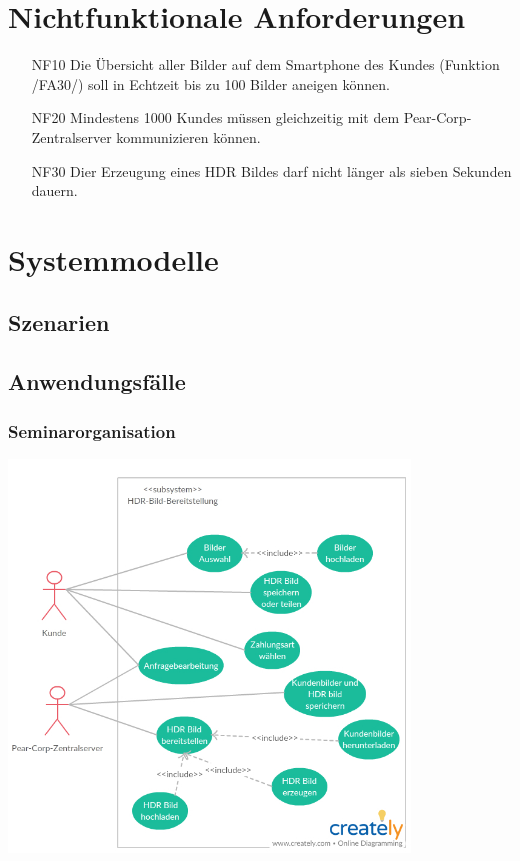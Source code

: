 \documentclass[parskip=full]{scrartcl}
\begin{document}
\section{Nichtfunktionale Anforderungen}
\begin{itemize}[nosep]
\item[NF10] Die Übersicht aller Bilder auf dem \gls{Smartphone} des \glspl{Kunde} (Funktion /FA30/) soll in Echtzeit bis zu 100 Bilder aneigen können.
\item[NF20] Mindestens 1000 \glspl{Kunde} müssen gleichzeitig mit dem Pear-Corp-Zentralserver kommunizieren können.
\item[NF30] Dier Erzeugung eines \gls{HDR Bild}es darf nicht länger als sieben Sekunden dauern.
\end{itemize} 

\section{Systemmodelle}

\subsection{Szenarien}

\subsection{Anwendungsfälle}
\subsubsection{Seminarorganisation}
\begin{center}
\includegraphics[width=0.8\textwidth]{Szenario1.jpg}
\end{center}
\end{document}
